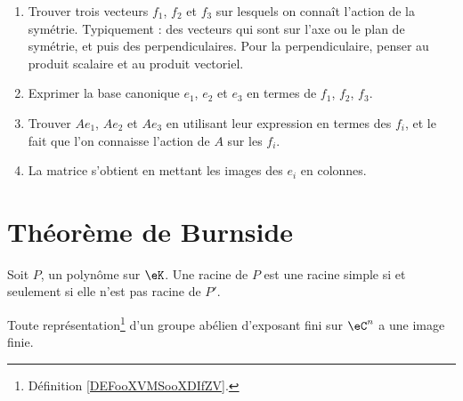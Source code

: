 \begin{enumerate}

	\item
	      Trouver trois vecteurs \( f_1\), \( f_2\) et \( f_3\) sur lesquels on connaît l'action de la symétrie. Typiquement : des vecteurs qui sont sur l'axe ou le plan de symétrie, et puis des perpendiculaires. Pour la perpendiculaire, penser au produit scalaire et au produit vectoriel.

	\item
	      Exprimer la base canonique \( e_1\), \( e_2\) et \( e_3\) en termes de \( f_1\), \( f_2\), \( f_3\).

	\item
	      Trouver \( Ae_1\), \( Ae_2\) et \( Ae_3\) en utilisant leur expression en termes des \( f_i\), et le fait que l'on connaisse l'action de \( A\) sur les \( f_i\).

	\item
	      La matrice s'obtient en mettant les images des \( e_i\) en colonnes.
\end{enumerate}

\section{Théorème de Burnside}

\begin{lemma}       \label{LemwXXzIt}
	Soit \( P\), un polynôme sur \( \eK\). Une racine de \( P\) est une racine simple si et seulement si elle n'est pas racine de \( P'\).
\end{lemma}

\begin{theorem}     \label{ThoBurnsideoPuCtS}
	Toute représentation\footnote{Définition \ref{DEFooXVMSooXDIfZV}.} d'un groupe abélien d'exposant fini sur \( \eC^n\) a une image finie.
\end{theorem}

